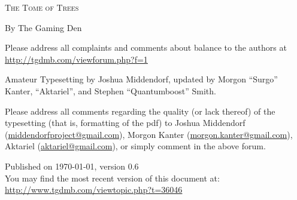 \pagestyle{plain}

\begin{center} \Huge

\textsc{The Tome of Trees}\end{center}



\vspace{2cm}
\begin{center}\large By The Gaming Den\end{center}


\newpage

\vspace*{4in}

\noindent Please address all complaints and comments about balance to the authors at\\
{\color{blue} \href{http://tgdmb.com/viewforum.php?f=1}{http://tgdmb.com/viewforum.php?f=1}}

\vspace{0.2in}



\noindent Amateur Typesetting by Joshua Middendorf, updated by Morgon ``Surgo'' Kanter, ``Aktariel'', and Stephen ``Quantumboost'' Smith.

\vspace{0.15in}

\noindent Please address all comments regarding the quality (or lack thereof) of the typesetting (that is, formatting of the pdf) to Joshua Middendorf (\href{mailto:middendorfproject@gmail.com}{middendorfproject@gmail.com}), Morgon Kanter (\href{mailto:morgon.kanter@gmail.com}{morgon.kanter@gmail.com}), Aktariel (\href{mailto:aktariel@gmail.com}{aktariel@gmail.com}), or simply comment in the above forum.





\vspace{1in}
\noindent Published on \today, version 0.6\\
\noindent You may find the most recent version of this document at:\\
{\color{blue} \href{http://www.tgdmb.com/viewtopic.php?t=36046}{http://www.tgdmb.com/viewtopic.php?t=36046}}

\newpage
